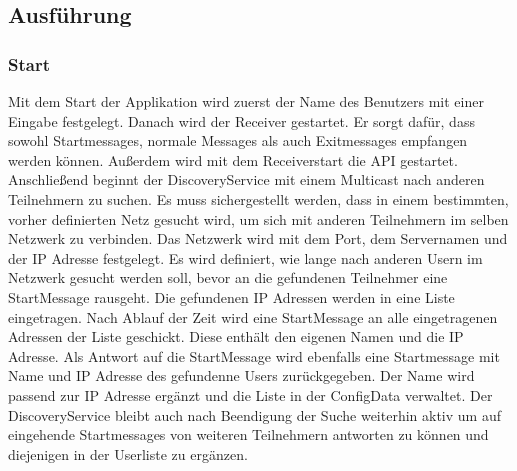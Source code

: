 \subsection{Ausführung}
\subsubsection{Start}
Mit dem Start der Applikation wird zuerst der Name des Benutzers mit einer Eingabe festgelegt. Danach wird der Receiver gestartet. Er sorgt dafür, dass sowohl Startmessages, normale Messages als auch Exitmessages empfangen werden können. Außerdem wird mit dem Receiverstart die API gestartet.
Anschließend beginnt der DiscoveryService mit einem Multicast nach anderen Teilnehmern zu suchen. Es muss sichergestellt werden, dass in einem bestimmten, vorher definierten Netz gesucht wird,
um sich mit anderen Teilnehmern im selben Netzwerk zu verbinden. Das Netzwerk wird mit dem Port, dem Servernamen und der IP Adresse festgelegt. Es wird definiert, wie lange nach anderen Usern im Netzwerk gesucht werden soll, bevor an die gefundenen
Teilnehmer eine StartMessage rausgeht. Die gefundenen IP Adressen werden in eine Liste eingetragen. 
Nach Ablauf der Zeit wird eine StartMessage an alle eingetragenen Adressen der Liste geschickt. Diese enthält den eigenen Namen und die IP Adresse. 
Als Antwort auf die StartMessage wird ebenfalls eine Startmessage mit Name und IP Adresse des gefundenne Users zurückgegeben.
Der Name wird passend zur IP Adresse ergänzt und die Liste in der ConfigData verwaltet. 
Der DiscoveryService bleibt auch nach Beendigung der Suche weiterhin aktiv um auf eingehende Startmessages von weiteren Teilnehmern antworten zu können und diejenigen in der Userliste zu ergänzen.


